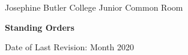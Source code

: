 \begin{titlepage}
   \begin{flushleft}
       \vspace*{3.5cm}

       Josephine Butler College Junior Common Room

       \vspace{1cm}
       \textbf{\Huge{\color{myred}Standing Orders}}
       \vspace{1cm}

       Date of Last Revision: Month 2020

       \vfill
            
   \end{flushleft}
\end{titlepage}
